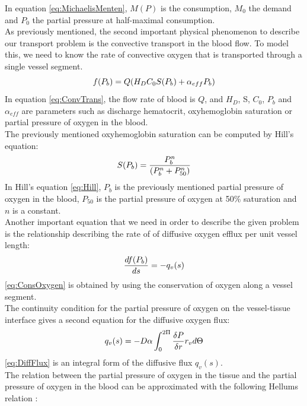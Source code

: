 %
In equation \ref{eq:MichaelisMenten}, $M(P)$ is the consumption, $M_0$ the demand and $P_0$ the partial pressure at half-maximal consumption.
\\As previously mentioned, the second important physical phenomenon to describe our transport problem is the convective transport in the blood flow. To model this, we need to know the rate of convective oxygen that is transported through a single vessel segment.
\begin{equation}
\\f(P_b) = Q(H_DC_0S(P_b) + \alpha_{eff}P_b)
\label{eq:ConvTrans}
\end{equation}
%
In equation \ref{eq:ConvTrans}, the flow rate of blood is $Q$, and $H_D$, S, $C_0$, $P_b$ and $\alpha_{eff}$ are parameters such as discharge hematocrit, oxyhemoglobin saturation or partial pressure of oxygen in the blood.
\\The previously mentioned oxyhemoglobin saturation can be computed by Hill's equation:
\begin{equation}
\\S(P_b) = \frac{P_b^n}{(P_b^n+P_{50}^n)}
\label{eq:Hill}
\end{equation}
In Hill's equation \ref{eq:Hill}, $P_b$ is the previously mentioned partial pressure of oxygen in the blood, $P_{50}$ is the partial pressure of oxygen at 50\% saturation and $n$ is a constant.
%
\\Another important equation that we need in order to describe the given problem is the relationship describing the rate of of diffusive oxygen efflux per unit vessel length:
\begin{equation}
\\ \frac{df(P_b)}{ds} = -q_v(s)
\label{eq:ConsOxygen}
\end{equation}
\ref{eq:ConsOxygen} is obtained by using the conservation of oxygen along a vessel segment.
%
\\The continuity condition for the partial pressure of oxygen on the vessel-tissue interface gives a second equation for the diffusive oxygen flux:
\begin{equation}
\\q_v(s) = -D\alpha \int_{0}^{2\Pi} 
\frac{\delta P}{\delta r}r_v d \Theta
\label{eq:DiffFlux}
\end{equation}
\ref{eq:DiffFlux} is an integral form of the diffusive flux $q_v(s)$.
%
\\The relation between the partial pressure of oxygen in the tissue and the partial pressure of oxygen in the blood can be approximated with the following  Hellums relation \cite{hellums1977resistance}:
